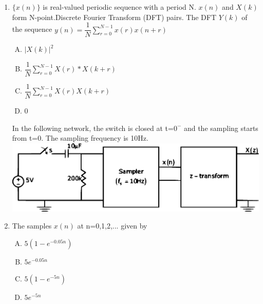 \documentclass[journal,12pt,twocolumn]{IEEEtran}
\begin{document}
\begin{enumerate}
\begin{enumerate}[(A)]
\end{enumerate}

\item $\{x(n)\}$ is real-valued periodic sequence with a period N. $x(n)$ and $X(k)$ form N-point.Discrete Fourier Transform (DFT) pairs. The DFT $Y(k)$ of the sequence $y(n)=\dfrac{1}{N}\sum_{r=0}^{N-1}x(r)x(n+r)$\\
\begin{enumerate}[(A)]

\setlength\itemsep{2em}

\item $
|X(k)|^{2}
$
\item $
\dfrac{1}{N}\sum_{r=0}^{N-1}X(r)*X(k+r)
$
\item $
\dfrac{1}{N}\sum_{r=0}^{N-1}X(r)X(k+r)
$
\item $
0
$\\


\end{enumerate}


In the following network, the switch is closed at t=$0^{-}$ and the sampling starts from t=0. The sampling frequency is 10Hz.\\

\includegraphics[scale=0.29]{fig8.eps}

\item  The samples $x(n)$ at n=0,1,2,... given by


\begin{enumerate}[(A)]

\item $5(1-e^{-0.05n})$

\item $5e^{-0.05n}$

\item $ 5(1-e^{-5n})$
\item $ 5e^{-5n}$




\end{enumerate}
\end{enumerate}
\end{document}
